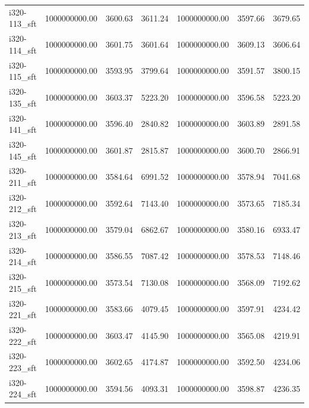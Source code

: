 \begin{tabular}{lrrrrrr}
i320-113\_sft &      1000000000.00 &                3600.63 &          3611.24 &    1000000000.00 &              3597.66 &        3679.65 \\
i320-114\_sft &      1000000000.00 &                3601.75 &          3601.64 &    1000000000.00 &              3609.13 &        3606.64 \\
i320-115\_sft &      1000000000.00 &                3593.95 &          3799.64 &    1000000000.00 &              3591.57 &        3800.15 \\
i320-135\_sft &      1000000000.00 &                3603.37 &          5223.20 &    1000000000.00 &              3596.58 &        5223.20 \\
i320-141\_sft &      1000000000.00 &                3596.40 &          2840.82 &    1000000000.00 &              3603.89 &        2891.58 \\
i320-145\_sft &      1000000000.00 &                3601.87 &          2815.87 &    1000000000.00 &              3600.70 &        2866.91 \\
i320-211\_sft &      1000000000.00 &                3584.64 &          6991.52 &    1000000000.00 &              3578.94 &        7041.68 \\
i320-212\_sft &      1000000000.00 &                3592.64 &          7143.40 &    1000000000.00 &              3573.65 &        7185.34 \\
i320-213\_sft &      1000000000.00 &                3579.04 &          6862.67 &    1000000000.00 &              3580.16 &        6933.47 \\
i320-214\_sft &      1000000000.00 &                3586.55 &          7087.42 &    1000000000.00 &              3578.53 &        7148.46 \\
i320-215\_sft &      1000000000.00 &                3573.54 &          7130.08 &    1000000000.00 &              3568.09 &        7192.62 \\
i320-221\_sft &      1000000000.00 &                3583.66 &          4079.45 &    1000000000.00 &              3597.91 &        4234.42 \\
i320-222\_sft &      1000000000.00 &                3603.47 &          4145.90 &    1000000000.00 &              3565.08 &        4219.91 \\
i320-223\_sft &      1000000000.00 &                3602.65 &          4174.87 &    1000000000.00 &              3592.50 &        4234.06 \\
i320-224\_sft &      1000000000.00 &                3594.56 &          4093.31 &    1000000000.00 &              3598.87 &        4236.35 \\

\end{tabular}
